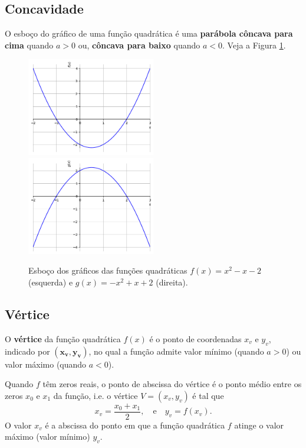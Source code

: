 \documentclass[../main.tex]{subfiles}
\begin{document}
\subsection{Concavidade}\label{subsec:FuncQuad-Concavidade}
O esboço do gráfico de uma função quadrática é uma \textbf{parábola côncava para cima} quando $a > 0$ ou, \textbf{côncava para baixo} quando $a < 0$. Veja a Figura \ref{fig:FuncQuadConcav}.
\begin{figure}[H]
  \centering
  \includegraphics[width=0.5\textwidth]{fig_func/fig_funquad_concavidade_cima}~
    \includegraphics[width=0.5\textwidth]{fig_func/fig_funquad_concavidade_baixo}
  \caption{Esboço dos gráficos das funções quadráticas $f(x) = x^2-x-2$ (esquerda) e $g(x)=-x^2+x+2$ (direita).}
  \label{fig:FuncQuadConcav}
\end{figure}
\subsection{Vértice}\label{subsec:FuncQuad-Vertice}
O \textbf{vértice} da função quadrática $f(x)$ é o ponto de coordenadas $x_v$ e $y_v$, indicado por $\boldsymbol{(x_v,y_v)}$, no qual a função admite valor mínimo (quando $a>0$) ou valor máximo (quando $a<0$). 

Quando $f$ têm zeros reais, o ponto de abscissa do vértice é o ponto médio entre os zeros $x_0$ e $x_1$ da função, i.e. o vértice $V = (x_v, y_v)$ é tal que
\begin{equation}
  x_v = \frac{x_0 + x_1}{2},\quad\text{e}\quad y_v = f(x_v). 
\end{equation}
O valor $x_v$ é a abscissa do ponto em que a função quadrática $f$ atinge o valor máximo (valor mínimo) $y_v$.
\end{document}
